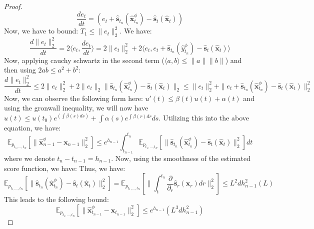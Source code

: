 \documentclass[11pt]{article}
\def\rvx{{\mathbf{x}}}
\def\vs{{\bm{s}}}
\begin{document}
\begin{proof}
    
\[
\frac{d e_t}{dt} = \left(e_t+ \hat{\vs}_{t_{n}}(\hat{\rvx}^\phi_{t_{n}}) - \hat{\vs}_{t}(\hat{\rvx}_t)\right)
\]
Now, we have to bound: $T_1 \leq \|e_t\|^2_2$. We have:
\[
\frac{d  \|e_t\|^2_2}{dt} = 2\langle e_t, \frac{de_t}{dt}\rangle  = 2 \|e_t\|_2^2 + 2 \langle e_t, e_t+ \hat{\vs}_{t_{n}}(\hat{y}^\phi_{t_{n}}) - \hat{\vs}_{t}(\hat{\rvx}_t)\rangle
\]
Now, applying cauchy schwartz in the second term ($\langle a,b\rangle \leq \|a\|\|b\|$) and then using $2ab \leq a^2+b^2$:
\[
\frac{d  \|e_t\|^2_2}{dt} \leq  2 \|e_t\|_2^2 + 2 \| e_t \|_2 \| \hat{\vs}_{t_{n}}(\hat{\rvx}^\phi_{t_{n}}) - \hat{\vs}_{t}(\hat{\rvx}_t)\|_2 \leq \|e_t\|_2^2 + \| e_t+ \hat{\vs}_{t_{n}}(\hat{\rvx}^\phi_{t_{n}}) - \hat{\vs}_{t}(\hat{\rvx}_t)\|^2_2
\]
Now, we can observe the following form here: $u'(t) \leq \beta(t) u(t)+ \alpha(t)$ and using the gronwall inequality, we will now have $u(t) \leq u(t_0) e^{(\int \beta(s)ds)}+  \int \alpha(s)e^{\int \beta(r)dr}ds$. Utilizing this into the above equation, we have:
\[
\mathbb{E}_{p_{t_1,...,t_N}} \left [ \|\hat{\rvx}^\phi_{n-1} - \rvx_{n-1}\|^2_2\right] \leq e^{h_{n-1}} \int_{t_{n-1}}^{t_n} \mathbb{E}_{p_{t_1,...,t_N}} \left [\|\hat{\vs}_{t_{n}}(\hat{\rvx}^\phi_{t_{n}}) - \hat{\vs}_{t}(\hat{\rvx}_t)\|^2_2\right ]dt
\]
where we denote $t_n-t_{n-1} = h_{n-1}$. Now, using the smoothness of the estimated score function, we have:
Thus, we have: 
\[
\mathbb{E}_{{p}_{t_1,...,t_N}} \left [\|\hat{\vs}_{t_{n}}(\hat{\rvx}^\phi_{t_{n}}) - \hat{\vs}_{t}(\hat{\rvx}_t)\|^2_2 \right] = \mathbb{E}_{{p}_{t_1,...,t_N}}\left[\|\int_t^{t_n}\frac{\partial}{\partial_r}\hat{\vs}_r (\rvx_r)dr\|_2^2\right] \leq L^2 d h^2_{n-1} (L)
\]
This leads to the following bound:
\[
\mathbb{E}_{p_{t_1,...,t_N}} [\|\hat{\rvx}^\phi_{t_{n-1}}-\rvx_{t_{n-1}}\|^2_2] \leq e^{h_{n-1}}(L^3dh_{n-1}^2)
\]
\end{proof}
\end{document}

